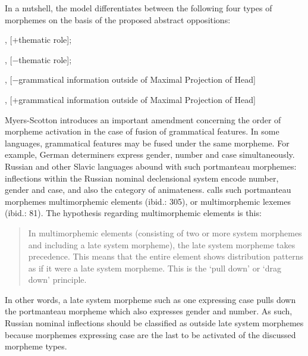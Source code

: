 In a nutshell, the model differentiates between the following four types of morphemes on the basis of the proposed abstract oppositions:

\begin{description}\sloppy
\item[content morphemes:] [+conceptually activated], [+thematic role];
\item[early system morphemes:] [+conceptually activated], [−thematic role];
\item[bridge late system morphemes:] [−conceptually activated], [−grammatical information outside of Maximal Projection of Head]
\item[outside late system morphemes:] [−conceptually activated], [+grammatical information outside of Maximal Projection of Head]
\end{description}

Myers-Scotton introduces an important amendment concerning the order of morpheme activation in the case of fusion of grammatical features. In some languages, grammatical features may be fused under the same morpheme. For example, German determiners express gender, number and case simultaneously. Russian and other Slavic languages abound with such portmanteau morphemes: inflections within the Russian nominal declensional system encode number, gender and case, and also the category of animateness. \citet[][]{myers-scotton-contact-2002} calls such portmanteau morphemes multimorphemic elements (ibid.: 305), or multimorphemic lexemes (ibid.: 81). The hypothesis regarding multimorphemic elements is this: 

\begin{quote}In multimorphemic elements (consisting of two or more system morphemes and including a late system morpheme), the late system morpheme takes precedence. This means that the entire element shows distribution patterns as if it were a late system morpheme. This is the `pull down' or `drag down' principle. \citep[][305]{myers-scotton-contact-2002}
\end{quote}

\begin{sloppypar}
\noindent In other words, a late system morpheme such as one expressing case pulls down the portmanteau morpheme which also expresses gender and number. As such, Russian nominal inflections should be classified as outside late system morphemes because morphemes expressing case are the last to be activated of the discussed morpheme types.
\end{sloppypar}

